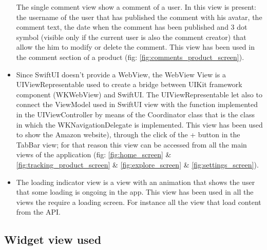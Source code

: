 \begin{itemize}
{        The single comment view show a comment of a user. In this view is present: the username of the user that has published the comment with his avatar, the comment text, the date when the comment has been published and 3 dot symbol (visible only if the current user is also the comment creator) that allow the him to modify or delete the comment.
        This view has been used in the comment section of a product (fig: \ref{fig:comments_product_screen}).
    }
    \item {
        Since SwiftUI doesn't provide a WebView, the WebView View is a UIViewRepresentable used to create a bridge between UIKit framework component (WKWebView) and SwiftUI. The UIViewRepresentable let also to connect the ViewModel used in SwiftUI view with the function implemented in the UIViewController by means of the Coordinator class that is the class in which the WKNavigationDelegate is implemented.
        This view has been used to show the Amazon website), through the click of the + button in the TabBar view; for that reason this view can be accessed from all the main views of the application (fig: \ref{fig:home_screen} \& \ref{fig:tracking_product_screen} \& \ref{fig:explore_screen} \& \ref{fig:settings_screen}).
    }
    \item {
        The loading indicator view is a view with an animation that shows the user that some loading is ongoing in the app.
        This view has been used in all the views the require a loading screen. For instance all the view that load content from the API.
    }
\end{itemize}


\newpage
\subsection{Widget view used}

